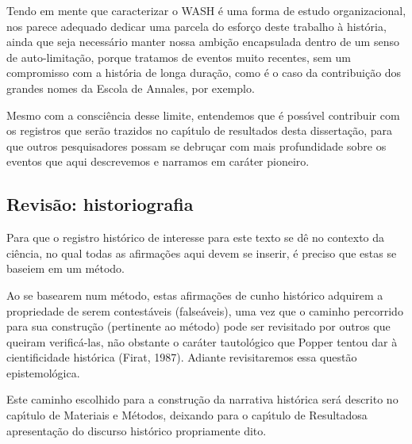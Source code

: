 \documentclass[
12pt,		%
openright,	%
twoside,  %
a4paper,			%
chapter=TITLE,		%
english,			%
french,				%
spanish,			%
brazil				%
]{USPSC-classe/USPSC}
\begin{document}
Tendo em mente que caracterizar o WASH \'e uma forma de estudo organizacional, nos parece adequado dedicar uma parcela do esfor\c{c}o deste trabalho \`a hist\'oria, ainda que seja necess\'ario manter nossa ambi\c{c}\~ao encapsulada dentro de um senso de auto-limita\c{c}\~ao, porque tratamos de eventos muito recentes, sem um compromisso com a hist\'oria de longa dura\c{c}\~ao, como \'e o caso da contribui\c{c}\~ao dos grandes nomes da Escola de Annales, por exemplo.









Mesmo com a consci\^encia desse limite, entendemos que \'e poss\'{\i}vel contribuir com os registros que ser\~ao trazidos no cap\'{\i}tulo de resultados desta disserta\c{c}\~ao, para que outros pesquisadores possam se debru\c{c}ar com mais profundidade sobre os eventos que aqui descrevemos e narramos em car\'ater pioneiro.









\subsection[Revis\~ao: historiografia]{Revis\~ao: historiografia}\label{Revis\~ao: historiografia}
Para que o registro hist\'orico de interesse para este texto se d\^e no contexto da ci\^encia, no qual todas as afirma\c{c}\~oes aqui devem se inserir, \'e preciso que estas se baseiem em um m\'etodo.









Ao se basearem num m\'etodo, estas afirma\c{c}\~oes de cunho hist\'orico adquirem a propriedade de serem contest\'aveis (false\'aveis), uma vez que o caminho percorrido para sua constru\c{c}\~ao (pertinente ao m\'etodo) pode ser revisitado por outros que queiram verific\'a-las, n\~ao obstante o car\'ater tautol\'ogico que Popper tentou dar \`a cientificidade hist\'orica  (Firat, 1987). Adiante revisitaremos essa quest\~ao epistemol\'ogica.









Este caminho escolhido para a constru\c{c}\~ao da narrativa hist\'orica ser\'a descrito no cap\'{\i}tulo de \textquotedbl Materiais e M\'etodos\textquotedbl , deixando para o cap\'{\i}tulo de \textquotedbl Resultados\textquotedbl  a apresenta\c{c}\~ao do discurso hist\'orico propriamente dito.
\end{document}
